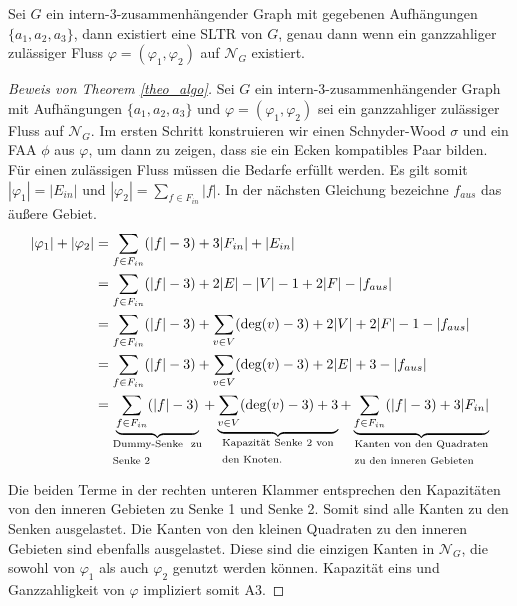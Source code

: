 \begin{theorem}\label{theo_algo}
Sei $G$ ein intern-3-zusammenhängender Graph mit gegebenen Aufhängungen $\{a_1,a_2,a_3\}$, dann existiert eine SLTR von $G$, genau dann wenn ein ganzzahliger zulässiger Fluss $\varphi=(\varphi_1,\varphi_2)$ auf $\mathcal{N}_G$ existiert.
\end{theorem}

\begin{proof}[Beweis von Theorem \ref{theo_algo}]
Sei $G$ ein intern-3-zusammenhängender Graph mit Aufhängungen $\{a_1,a_2,a_3\}$ und $\varphi=(\varphi_1,\varphi_2)$ sei ein ganzzahliger zulässiger Fluss auf $\mathcal{N}_G$. Im ersten Schritt konstruieren wir einen Schnyder-Wood $\sigma$ und ein FAA $\phi$ aus $\varphi$, um dann zu zeigen, dass sie ein Ecken kompatibles Paar bilden. Für einen zulässigen Fluss müssen die Bedarfe erfüllt werden. Es gilt somit $|\varphi_1| =  |E_{in}|$ und $|\varphi_2| = \sum_{f \in F_{in}} |f|$. In der nächsten Gleichung bezeichne $f_{aus}$ das äußere Gebiet.
\begin{equation}\label{eq_sat}
\begin{split}
|\varphi_1| + |\varphi_2| & = \sum_{f \in F_{in}} (|f|-3) + 3|F_{in}| + |E_{in}|\\
		& = \sum_{f \in F_{in}} (|f|-3) + 2|E| -|V| - 1 + 2|F| - |f_{aus}|\\
		& = \sum_{f \in F_{in}} (|f|-3) + \sum_{v \in V} (\text{deg}(v)-3) + 2|V| + 2|F| - 1 - |f_{aus}|\\
		& = \sum_{f \in F_{in}} (|f|-3) + \sum_{v \in V} (\text{deg}(v)-3) + 2|E| + 3 - |f_{aus}|\\
		& = \underbrace{\sum_{f \in F_{in}}(|f|-3)  }_{\text{\parbox{8em}{Dummy-Senke zu Senke 2}}} + \underbrace{\sum_{v \in V} (\text{deg}(v)-3) +3 }_{\text{\parbox{10em}{Kapazität Senke 2 von den Knoten.}}} +\underbrace{\sum_{f \in F_{in}}(|f|-3) + 3|F_{in}|}_{\text{\parbox{12em}{Kanten von den Quadraten zu den inneren Gebieten}}}
\end{split}
\end{equation}

Die beiden Terme in der rechten unteren Klammer entsprechen den Kapazitäten von den inneren Gebieten zu Senke 1 und Senke 2. Somit sind alle Kanten zu den Senken ausgelastet. Die Kanten von den kleinen Quadraten zu den inneren Gebieten sind ebenfalls ausgelastet. Diese sind die einzigen Kanten in $\mathcal{N}_G$, die sowohl von $\varphi_1$ als auch $\varphi_2$ genutzt werden können. Kapazität eins und Ganzzahligkeit von $\varphi$ impliziert somit A3.


\end{proof}
